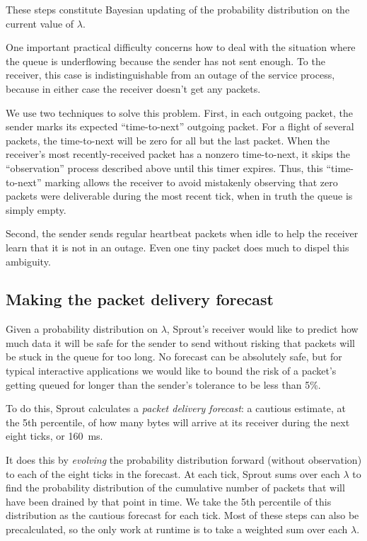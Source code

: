 These steps constitute Bayesian updating of the probability
distribution on the current value of $\lambda$.

One important practical difficulty concerns how to deal with the
situation where the queue is underflowing because the sender has not
sent enough. To the receiver, this case is indistinguishable from an
outage of the service process, because in either case the receiver
doesn't get any packets.

We use two techniques to solve this problem. First, in each outgoing
packet, the sender marks its expected ``time-to-next'' outgoing
packet.  For a flight of several packets,
the time-to-next will be zero for all but the last packet. When the
receiver's most recently-received packet has a nonzero time-to-next,
it skips the ``observation'' process described above until this timer
expires. Thus, this ``time-to-next'' marking allows the receiver to
avoid mistakenly observing that zero packets were deliverable during
the most recent tick, when in truth the queue is simply empty.

Second, the sender sends regular heartbeat packets when idle to help
the receiver learn that it is not in an outage. Even one tiny packet
does much to dispel this ambiguity.

\subsection{Making the packet delivery forecast}

Given a probability distribution on $\lambda$, Sprout's receiver would
like to predict how much data it will be safe for the sender to send
without risking that packets will be stuck in the queue for too
long. No forecast can be absolutely safe, but for typical interactive
applications we would like to bound the risk of a packet's getting
queued for longer than the sender's tolerance to be less than 5\%.

To do this, Sprout calculates a \emph{packet delivery forecast}: a
cautious estimate, at the 5th percentile, of how many bytes will
arrive at its receiver during the next eight ticks, or 160~ms.

It does this by \emph{evolving} the probability distribution forward
(without observation) to each of the eight ticks in the forecast.  At
each tick, Sprout sums over each $\lambda$ to find the probability
distribution of the cumulative number of packets that will have been
drained by that point in time. We take the 5th percentile of this
distribution as the cautious forecast for each tick. Most
of these steps can also be precalculated, so the only work at
runtime is to take a weighted sum over each $\lambda$.

